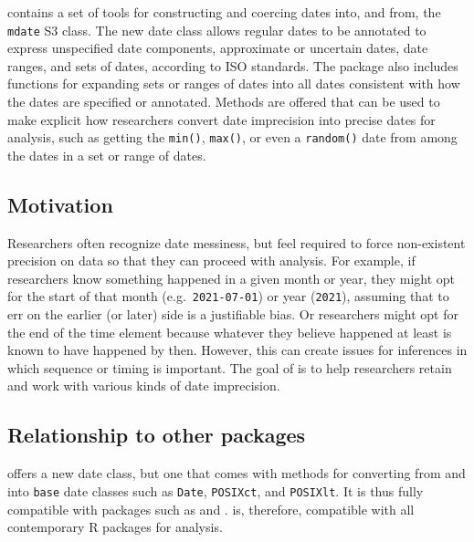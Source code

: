 \documentclass[
]{jss}
\begin{document}
 contains a set of tools for constructing and coercing
dates into, and from, the \texttt{mdate} S3 class. The new date class
allows regular dates to be annotated to express unspecified date
components, approximate or uncertain dates, date ranges, and sets of
dates, according to ISO standards. The package also includes functions
for expanding sets or ranges of dates into all dates consistent with how
the dates are specified or annotated. Methods are offered that can be
used to make explicit how researchers convert date imprecision into
precise dates for analysis, such as getting the \texttt{min()},
\texttt{max()}, or even a \texttt{random()} date from among the dates in
a set or range of dates.

\hypertarget{motivation}{%
\subsection{Motivation}\label{motivation}}

Researchers often recognize date messiness, but feel required to force
non-existent precision on data so that they can proceed with analysis.
For example, if researchers know something happened in a given month or
year, they might opt for the start of that month
(e.g.~\texttt{2021-07-01}) or year (\texttt{2021}), assuming that to err
on the earlier (or later) side is a justifiable bias. Or researchers
might opt for the end of the time element because whatever they believe
happened at least is known to have happened by then. However, this can
create issues for inferences in which sequence or timing is important.
The goal of  is to help researchers retain and work with
various kinds of date imprecision.

\hypertarget{relationship-to-other-packages}{%
\subsection{Relationship to other
packages}\label{relationship-to-other-packages}}

 offers a new date class, but one that comes with
methods for converting from and into \texttt{base} date classes such as
\texttt{Date}, \texttt{POSIXct}, and \texttt{POSIXlt}. It is thus fully
compatible with packages such as 
\citep{grolemundDatesTimesMade2011} and 
\citep{eddelbuettelAnytimeEasierDate2019}.  is,
therefore, compatible with all contemporary R packages for analysis.
\end{document}
